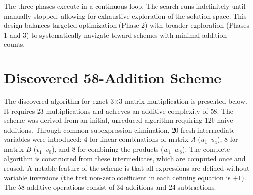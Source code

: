 \documentclass{article}
\begin{document}
The three phases execute in a continuous loop. The search runs indefinitely until manually stopped, allowing for exhaustive exploration of the solution space. This design balances targeted optimization (Phase 2) with broader exploration (Phases 1 and 3) to systematically navigate toward schemes with minimal addition counts.
\clearpage

\section{Discovered 58-Addition Scheme}

The discovered algorithm for exact 3×3 matrix multiplication is presented below. It requires 23 multiplications and achieves an additive complexity of 58. The scheme was derived from an initial, unreduced algorithm requiring 120 naive additions. Through common subexpression elimination, 20 fresh intermediate variables were introduced: 4 for linear combinations of matrix $A$ ($u_1$–$u_4$), 8 for matrix $B$ ($v_1$–$v_8$), and 8 for combining the products ($w_1$–$w_8$). The complete algorithm is constructed from these intermediates, which are computed once and reused. A notable feature of the scheme is that all expressions are defined without variable inversions (the first non-zero coefficient in each defining equation is $+1$). The 58 additive operations consist of 34 additions and 24 subtractions.
\end{document}
